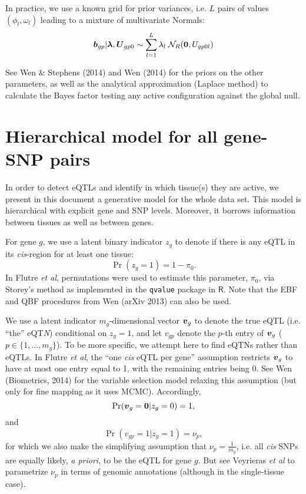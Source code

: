 \documentclass[10pt]{article}
\newcommand{\Prob}{\Pr} %
\newcommand{\Norm}{{\mathcal{N}}} %
\newcommand{\vv}{\mbox{\boldmath$v$}}
\newcommand{\Uv}{\mbox{\boldmath$U$}}
\begin{document}
In practice, we use a known grid for prior variances, i.e. $L$ pairs of values $(\phi_l,\omega_l)$ leading to a mixture of multivariate Normals:
\begin{equation}
  \label{prior_b_mixt}
  \bm{b}_{gp} | \bm{\lambda},\Uv_{gp0} \sim \sum_{l=1}^L \lambda_l \; \Norm_R(\bm{0}, U_{gp0l})
\end{equation}

See Wen \& Stephens (2014)  and Wen (2014) for the priors on the other parameters, as well as the analytical approximation (Laplace method) to calculate the Bayes factor testing any active configuration against the global null.



\section{Hierarchical model for all gene-SNP pairs}

In order to detect eQTLs and identify in which tissue(s) they are active, we present in this document a generative model for the whole data set.
This model is hierarchical with explicit gene and SNP levels.
Moreover, it borrows information between tissues as well as between genes.

\bigskip

For gene $g$, we use a latent binary indicator $z_g$ to denote if there is any eQTL in its \textit{cis}-region for at least one tissue:
\begin{equation}
  \Prob(z_g = 1) = 1 - \pi_0.
\end{equation}
In Flutre \textit{et al}, permutations were used to estimate this parameter, $\pi_0$, via Storey's method as implemented in the \verb+qvalue+ package in $\mathsf{R}$. Note that the EBF and QBF procedures from Wen (arXiv 2013) can also be used.

\bigskip

We use a latent indicator $m_g$-dimensional vector $\vv_g$ to denote the true eQTL (i.e. ``the'' eQT\emph{N}) conditional on $z_g=1$, and let $v_{gp}$ denote the $p$-th entry of $\vv_g$ ($p \in \{1,\dots,m_g\}$).
To be more specific, we attempt here to find eQTNs rather than eQTLs.
In Flutre \textit{et al}, the ``one \textit{cis} eQTL per gene'' assumption restricts $\vv_g$ to have at most one entry equal to 1, with the remaining entries being 0.
See Wen (Biometrics, 2014) for the variable selection model relaxing this assumption (but only for fine mapping as it uses MCMC).
Accordingly,
\begin{equation*}
  \Prob(\vv_g = \bm{0}  | z_g = 0) = 1,
\end{equation*}
and
\begin{equation}
  \Prob(v_{gp} = 1  | z_g = 1)  =  \nu_{p},
\end{equation}
for which we also make the simplifying assumption that $\nu_p = \frac{1}{m_g}$, i.e. all \textit{cis} SNPs are equally likely, \emph{a priori}, to be the eQTL for gene $g$.
But see Veyrieras \textit{et al} to parametrize $\nu_p$ in terms of genomic annotations (although in the single-tissue case).
\end{document}
